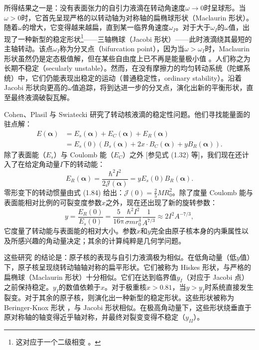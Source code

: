 所得结果之一是：没有表面张力的自引力液滴在转动角速度$\omega\rightarrow0$时呈球形。当$\omega>0$时，它首先呈现严格的以转动轴为对称轴的扁椭球形状（Maclaurin
形状）。随着$\omega$的增大，它变得越来越扁，直到某一临界角速度$\omega_{I}$。对于大于$\omega_{I}$的$\omega$值，出现了一种新型的稳定形状\footnote{这对应于一个二级相变 \cite{BR76}。}——三轴椭球（Jacobi
形状）——此时液滴绕其最短的主轴转动。该点$\omega_{I}$称为分叉点（bifurcation point），因为当$\omega>\omega_{I}$时，Maclaurin
形状虽然仍是定态极值解，但在某些自由度上已不再是能量极小值 \cite{Ro67}。人们称之为长期不稳定（secularly unstable）。然而，在没有摩擦力的均匀转动系统（陀螺系统）中，它们仍能表现出稳定的运动（普通稳定性，ordinary
stability）\cite{Ly58}。沿着 Jacobi 形状向更高的$\omega$值追踪，将到达进一步的分叉点，演化出新的平衡形状，直至最终液滴破裂瓦解。

Cohen、Plasil 与 Swiatecki \cite{CPS74} 研究了转动核液滴的稳定性问题。他们寻找能量面的驻点解：
\begin{align}
E(\boldsymbol{\alpha}) & =E_{s}(\boldsymbol{\alpha})+E_{C}(\boldsymbol{\alpha})+E_{R}(\boldsymbol{\alpha})\nonumber \\
 & =E_{s}(0)(B_{s}(\boldsymbol{\alpha})+2x\cdot B_{C}(\boldsymbol{\alpha})+yB_{R}(\boldsymbol{\alpha})).\label{eq:1.85}
\end{align}
除了表面能（$E_{s}$）与 Coulomb 能（$E_{C}$）之外 {[}参见式 (1.32) 等{]}，我们现在还计入了在给定角动量$I$下的转动能：
\begin{equation}
E_{R}(\boldsymbol{\alpha})=\frac{\hbar^{2}I^{2}}{2\mathcal{J}(\boldsymbol{\alpha})}=yE_{s}(0)B_{R}(\boldsymbol{\alpha}).\label{eq:1.86}
\end{equation}
零形变下的转动惯量由式 (1.84) 给出：$\mathcal{J}(0)=\frac{2}{5}MR^{2}_{0}$。除了度量
Coulomb 能与表面能相对比例的可裂变度参数$x$之外，现在还出现了新的旋转参数：
\begin{equation}
y=\frac{E_{R}(0)}{E_{s}(0)}=\frac{5}{16\mathrm{\pi}}\frac{\hbar^{2}I^{2}}{\sigma mr^{4}_{0}}\frac{1}{A^{7/3}}\approx2I^{2}A^{-7/3},\label{eq:1.87}
\end{equation}
它度量了转动能与表面能的相对大小。参数$x$和$y$完全由原子核本身的内秉属性以及所感兴趣的角动量决定；其余的计算纯粹是几何学问题。

这些研究 \cite{CPS74} 的结论是：原子核的表现与自引力液滴极为相似。在低角动量（低$y$值）下，原子核呈现绕转动轴轴对称的扁平形状。它们被称为
Hiskes 形状，与严格的扁椭球（Maclaurin 形状）十分相似。它们在达到临界值$y_{I}$（对应于 Jacobi 点）之前保持稳定。$y_{I}$的数值依赖于$x$。对于极重核$x>0.81$，当$y>y_{I}$时系统直接发生裂变。对于其余的原子核，则演化出一种新型的稳定形状。这些形状被称为
Beringer-Knox 形状 \cite{BK61}，与 Jacobi 形状相似。在极高角动量下，这些形状绕垂直于原对称轴的轴变得近乎轴对称，并最终对裂变变得不稳定（$y_{II}$）。

